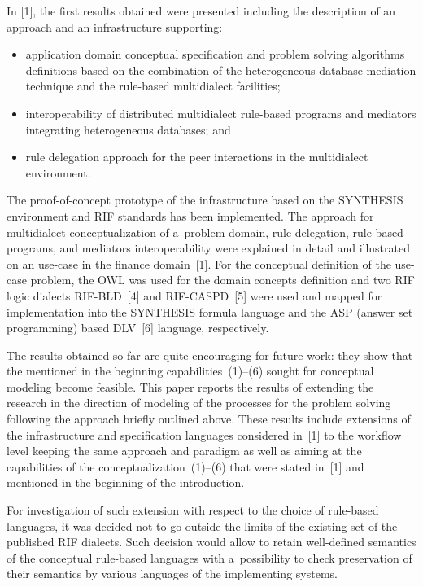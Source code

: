 \begin{multicols}{2}
  In [1], the first results obtained were presented including the description of an
approach and an infrastructure supporting:
  \begin{itemize}
\item application domain conceptual specification and problem solving algorithms
definitions based on the combination of the heterogeneous database mediation
technique and the rule-based multidialect facilities;
\item interoperability of distributed multidialect rule-based programs and mediators
integrating heterogeneous databases; and
\item rule delegation approach for the peer interactions in the multidialect
environment.
\end{itemize}

  The proof-of-concept prototype of the infrastructure based on the SYNTHESIS
environment and RIF standards has been implemented. The approach for multidialect
conceptualization of a~problem domain, rule delegation, rule-based programs, and
mediators interoperability were explained in detail and illustrated on an use-case in
the finance domain~[1]. For the conceptual definition of the use-case problem, the
OWL was used for the domain concepts definition and two RIF logic dialects
RIF-BLD~[4] and RIF-CASPD~[5] were used and mapped for implementation into the
SYNTHESIS formula language and the ASP (answer set programming)
based DLV~[6] language, respectively.

  The results obtained so far are quite encouraging for future work: they show that
the mentioned in the beginning capabilities~(1)--(6) sought for conceptual modeling
become feasible. This paper reports the results of extending the research in the
direction of modeling of the processes for the problem solving following the approach
briefly outlined above. These results include extensions of the infrastructure and
specification languages considered in~[1] to the workflow level keeping the same
approach and paradigm as well as aiming at the capabilities of the
conceptualization~(1)--(6) that were stated in~[1] and mentioned in the beginning of
the introduction.

  For investigation of such extension with respect to the choice of rule-based languages, it was
decided not to go outside the limits of the existing set of the published RIF dialects.
Such decision would allow to retain well-defined semantics of the conceptual
rule-based languages with a~possibility to check preservation of their semantics by various
languages of the implementing systems.


\end{multicols}

